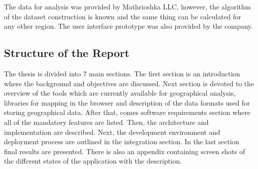 The data for analysis was provided by Mathrioshka LLC, however, the algorithm of the dataset
construction is known and the same thing can be calculated for any other region. The user
interface prototype was also provided by the company.

\subsection{Structure of the Report}

The thesis is divided into 7 main sections. The first section is an introduction where the
background and objectives are discussed. Next section is devoted to the overview of the tools which
are currently available for geographical analysis, libraries for mapping in the browser and
description of the data formats used for storing geographical data. After that, comes software
requirements section where all of the mandatory features are listed. Then, the architecture and
implementation are described. Next, the development environment and deployment process are outlined
in the integration section. In the last section final results are presented. There is also an
appendix containing screen shots of the different states of the application with the description.
